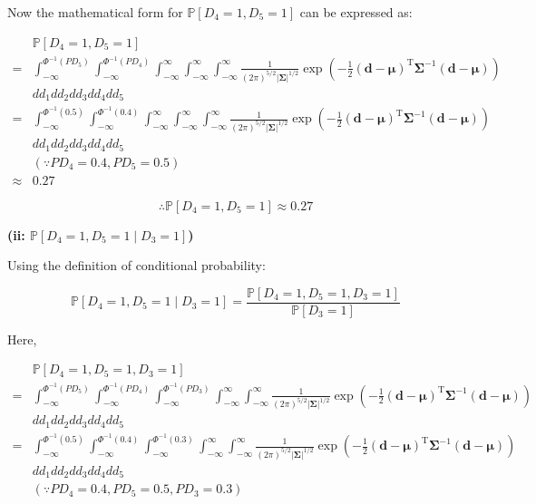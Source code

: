 \documentclass[11pt]{article}
\renewcommand\part[1]{\vspace{.10in}\textbf{(#1)}}
\renewcommand{\P}{\mathbb{P}}
\begin{document}
Now the mathematical form for $\P[D_4 = 1, D_5 = 1]$
can be expressed as:

$$
\begin{aligned}
& \P[D_4 = 1, D_5 = 1] \\
=& \int_{-\infty}^{\Phi^{-1}(PD_5)}
\int_{-\infty}^{\Phi^{-1}(PD_4)}
\int_{-\infty}^{\infty}
\int_{-\infty}^{\infty}
\int_{-\infty}^{\infty}
\frac{1}{(2\pi)^{5/2}|\mathbf{\Sigma}|^{1/2}}\exp\left(-\frac{1}{2}(\mathbf{d}-\mathbf{\mu})^{\mathrm{T}}\mathbf{\Sigma}^{-1}(\mathbf{d}-\mathbf{\mu})\right) \\
& d d_1 d d_2 d d_3 d d_4 d d_5 \\
=& \int_{-\infty}^{\Phi^{-1}(0.5)}
\int_{-\infty}^{\Phi^{-1}(0.4)}
\int_{-\infty}^{\infty}
\int_{-\infty}^{\infty}
\int_{-\infty}^{\infty}
\frac{1}{(2\pi)^{5/2}|\mathbf{\Sigma}|^{1/2}}\exp\left(-\frac{1}{2}(\mathbf{d}-\mathbf{\mu})^{\mathrm{T}}\mathbf{\Sigma}^{-1}(\mathbf{d}-\mathbf{\mu})\right) \\
& d d_1 d d_2 d d_3 d d_4 d d_5 \\
&(\because PD_4 = 0.4, PD_5 = 0.5) \\
\approx & 0.27
\end{aligned}
$$

$$
\therefore
\P[D_4 = 1, D_5 = 1]
\approx 0.27
$$

\part{ii: $\P[D_4 = 1, D_5 = 1 \mid D_3 = 1]$}

Using the definition of conditional probability:

$$
\P[D_4 = 1, D_5 = 1 \mid D_3 = 1] =
\frac{\P[D_4 = 1, D_5 = 1, D_3 = 1]}{\P[D_3 = 1]}
$$

\newpage

Here,

$$
\begin{aligned}
& \P[D_4 = 1, D_5 = 1, D_3 = 1] \\
=& \int_{-\infty}^{\Phi^{-1}(PD_5)}
\int_{-\infty}^{\Phi^{-1}(PD_4)}
\int_{-\infty}^{\Phi^{-1}(PD_3)}
\int_{-\infty}^{\infty}
\int_{-\infty}^{\infty}
\frac{1}{(2\pi)^{5/2}|\mathbf{\Sigma}|^{1/2}}\exp\left(-\frac{1}{2}(\mathbf{d}-\mathbf{\mu})^{\mathrm{T}}\mathbf{\Sigma}^{-1}(\mathbf{d}-\mathbf{\mu})\right) \\
& d d_1 d d_2 d d_3 d d_4 d d_5 \\
=& \int_{-\infty}^{\Phi^{-1}(0.5)}
\int_{-\infty}^{\Phi^{-1}(0.4)}
\int_{-\infty}^{\Phi^{-1}(0.3)}
\int_{-\infty}^{\infty}
\int_{-\infty}^{\infty}
\frac{1}{(2\pi)^{5/2}|\mathbf{\Sigma}|^{1/2}}\exp\left(-\frac{1}{2}(\mathbf{d}-\mathbf{\mu})^{\mathrm{T}}\mathbf{\Sigma}^{-1}(\mathbf{d}-\mathbf{\mu})\right) \\
& d d_1 d d_2 d d_3 d d_4 d d_5 \\
&(\because PD_4 = 0.4, PD_5 = 0.5, PD_3 = 0.3)
\end{aligned}
$$
\end{document}
